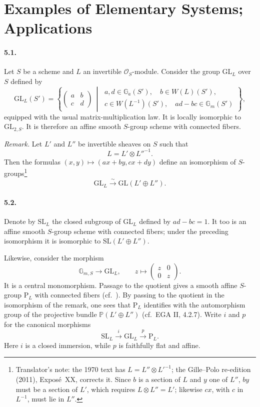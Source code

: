 \section{Examples of Elementary Systems; Applications}

\paragraph{\textbf{5.1.}}
Let \(S\) be a scheme and \(L\) an invertible
\(\mathcal O_S\)-module.  Consider the group \(\mathrm{GL}_L\) over
\(S\) defined by
\[
 \mathrm{GL}_L(S')
 =
 \left\{
 \begin{pmatrix}a&b\\c&d\end{pmatrix}
 \ \middle|\
 \begin{array}{l}
 a,d\in\mathbb G_a(S'),\quad b\in W(L)(S'),\\
 c\in W(L^{-1})(S'),\quad ad-bc\in\mathbb G_m(S')
 \end{array}
 \right\},
\]
equipped with the usual matrix-multiplication law.  It is locally
isomorphic to \(\mathrm{GL}_{2,S}\).  It is therefore an affine smooth
\(S\)-group scheme with connected fibers.

\smallskip
\noindent\textit{Remark.}
Let \(L'\) and \(L''\) be invertible sheaves on \(S\) such that
\[
 L=L'\otimes L''^{-1}.
\]
Then the formulas \((x,y)\mapsto(ax+by,cx+dy)\) define an
isomorphism of \(S\)-groups\footnote{Translator's note: the 1970 text has \(L=L''\otimes L'^{-1}\);
the Gille--Polo re-edition (2011), Exposé~XX, corrects it. Since \(b\) is a section of \(L\) and
\(y\) one of \(L''\), \(by\) must be a section of \(L'\), which requires \(L\otimes L''=L'\);
likewise \(cx\), with \(c\) in \(L^{-1}\), must lie in \(L''\).}
\[
 \mathrm{GL}_L\xrightarrow{\ \sim\ }\mathrm{GL}(L'\oplus L'').
\]

\paragraph{\textbf{5.2.}}
Denote by \(\mathrm{SL}_L\) the closed subgroup of
\(\mathrm{GL}_L\) defined by \(ad-bc=1\).  It too is an affine smooth
\(S\)-group scheme with connected fibers; under the preceding
isomorphism it is isomorphic to \(\mathrm{SL}(L'\oplus L'')\).

Likewise, consider the morphism
\[
 \mathbb G_{m,S}\longrightarrow\mathrm{GL}_L,
 \qquad
 z\longmapsto\begin{pmatrix}z&0\\0&z\end{pmatrix}.
\]
It is a central monomorphism.  Passage to the quotient gives a smooth
affine \(S\)-group \(\mathrm P_L\) with connected fibers
\textup{(cf.\ )}.  By passing to the quotient in the
isomorphism of the remark, one sees that \(\mathrm P_L\)
identifies with the automorphism group of the projective bundle
\(\mathbb P(L'\oplus L'')\) \textup{(cf.\ EGA II, 4.2.7)}.
Write \(i\) and \(p\) for the canonical morphisms
\[
 \mathrm{SL}_L\xrightarrow{\ i\ }\mathrm{GL}_L
   \xrightarrow{\ p\ }\mathrm P_L.
\]
Here \(i\) is a closed immersion, while \(p\) is faithfully flat and
affine.

